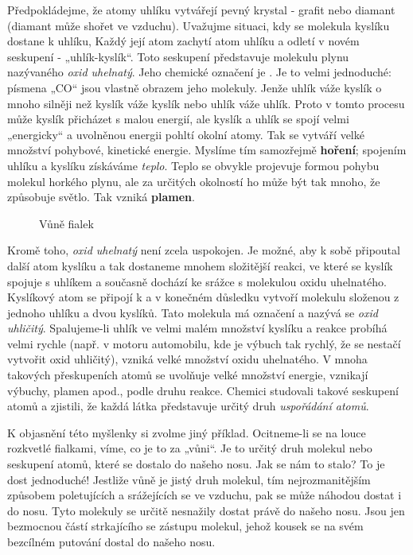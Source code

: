      Předpokládejme, že atomy uhlíku vytvářejí pevný krystal - grafit nebo diamant (diamant může 
      shořet ve vzduchu). Uvažujme situaci, kdy se molekula kyslíku dostane k uhlíku, Každý její 
      atom zachytí atom uhlíku a odletí v novém seskupení - „uhlík-kyslík“. Toto seskupení 
      představuje molekulu plynu nazývaného \emph{oxid uhelnatý}. Jeho chemické označení je 
      . Je to velmi jednoduché: písmena „CO“ jsou vlastně obrazem jeho molekuly. Jenže 
      uhlík váže kyslík o mnoho silněji než kyslík váže kyslík nebo uhlík váže uhlík. Proto v tomto 
      procesu může kyslík přicházet s malou energií, ale kyslík a uhlík se spojí velmi „energicky“ 
      a uvolněnou energii pohltí okolní atomy. Tak se vytváří velké množství pohybové, kinetické 
      energie. Myslíme tím samozřejmě \textbf{hoření}; spojením uhlíku a kyslíku získáváme 
      \emph{teplo}. Teplo se obvykle projevuje formou pohybu molekul horkého plynu, ale za určitých 
      okolností ho může být tak mnoho, že způsobuje světlo. Tak vzniká \textbf{plamen}.
      
      \begin{figure}[hbt!]    %
        \centering
        \caption{Vůně fialek \cite[s.~24]{Feynman01}}
        \label{fyz:fig015}
      \end{figure}

      Kromě toho, \emph{oxid uhelnatý} není zcela uspokojen. Je možné, aby k sobě připoutal další 
      atom kyslíku a tak dostaneme mnohem složitější reakci, ve které se kyslík spojuje s uhlíkem a 
      současně dochází ke srážce s molekulou oxidu uhelnatého. Kyslíkový atom se připojí k  
      a v konečném důsledku vytvoří molekulu složenou z jednoho uhlíku a dvou kyslíků. Tato 
      molekula má označení  a nazývá se \emph{oxid uhličitý}. Spalujeme-li uhlík ve velmi 
      malém množství kyslíku a reakce probíhá velmi rychle (např. v motoru automobilu, kde je 
      výbuch tak rychlý, že se nestačí vytvořit oxid uhličitý), vzniká velké množství oxidu 
      uhelnatého. V mnoha takových přeskupeních atomů se uvolňuje velké množství energie, vznikají 
      výbuchy, plamen apod., podle druhu reakce. Chemici studovali takové seskupení atomů a 
      zjistili, že každá látka představuje určitý druh \emph{uspořádání atomů}.

      K objasnění této myšlenky si zvolme jiný příklad. Ocitneme-li se na louce rozkvetlé fialkami, 
      víme, co je to za „vůni“. Je to určitý druh molekul nebo seskupení atomů, které se dostalo do 
      našeho nosu. Jak se nám to stalo? To je dost jednoduché! Jestliže vůně je jistý druh molekul, 
      tím nejrozmanitějším způsobem poletujících a srážejících se ve vzduchu, pak se může náhodou 
      dostat i do nosu. Tyto molekuly se určitě nesnažily dostat právě do našeho nosu. Jsou jen 
      bezmocnou částí strkajícího se zástupu molekul, jehož kousek se na svém bezcílném putování 
      dostal do našeho nosu.      
      
